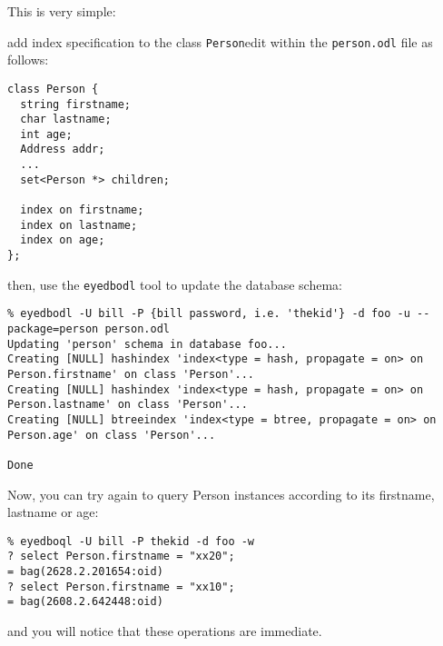 This is very simple:
\be
\item add index specification to the class \texttt{Person}edit within
the \texttt{person.odl} file as follows:
\verbsize \begin{verbatim}
class Person {
  string firstname;
  char lastname;
  int age;
  Address addr;
  ...
  set<Person *> children;

  index on firstname;
  index on lastname;
  index on age;
};
\end{verbatim}
\normalsize
\item then, use the \texttt{eyedbodl} tool to update the database schema:
\verbsize \begin{verbatim}
% eyedbodl -U bill -P {bill password, i.e. 'thekid'} -d foo -u --package=person person.odl
Updating 'person' schema in database foo...
Creating [NULL] hashindex 'index<type = hash, propagate = on> on Person.firstname' on class 'Person'...
Creating [NULL] hashindex 'index<type = hash, propagate = on> on Person.lastname' on class 'Person'...
Creating [NULL] btreeindex 'index<type = btree, propagate = on> on Person.age' on class 'Person'...

Done
\end{verbatim}
\normalsize
\ee
Now, you can try again to query Person instances according to its
firstname, lastname or age:
\verbsize \begin{verbatim}
% eyedboql -U bill -P thekid -d foo -w
? select Person.firstname = "xx20";
= bag(2628.2.201654:oid)
? select Person.firstname = "xx10";
= bag(2608.2.642448:oid)
\end{verbatim}
\normalsize
and you will notice that these operations are immediate.


